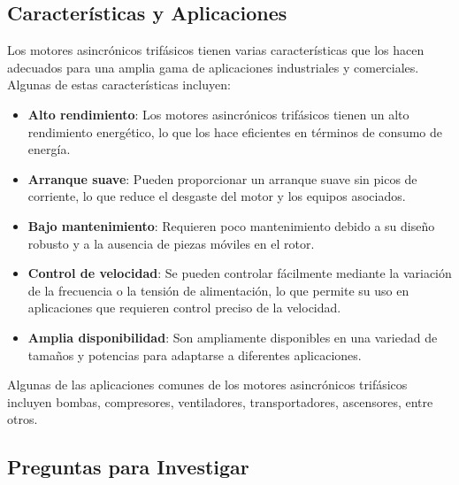 \documentclass[../main]{subfiles}
\begin{document}
\subsection*{Características y Aplicaciones}

Los motores asincrónicos trifásicos tienen varias características que los hacen adecuados para una amplia gama de aplicaciones industriales y comerciales. Algunas de estas características incluyen:

\begin{itemize}
    \item \textbf{Alto rendimiento}: Los motores asincrónicos trifásicos tienen un alto rendimiento energético, lo que los hace eficientes en términos de consumo de energía.
    \item \textbf{Arranque suave}: Pueden proporcionar un arranque suave sin picos de corriente, lo que reduce el desgaste del motor y los equipos asociados.
    \item \textbf{Bajo mantenimiento}: Requieren poco mantenimiento debido a su diseño robusto y a la ausencia de piezas móviles en el rotor.
    \item \textbf{Control de velocidad}: Se pueden controlar fácilmente mediante la variación de la frecuencia o la tensión de alimentación, lo que permite su uso en aplicaciones que requieren control preciso de la velocidad.
    \item \textbf{Amplia disponibilidad}: Son ampliamente disponibles en una variedad de tamaños y potencias para adaptarse a diferentes aplicaciones.
\end{itemize}

Algunas de las aplicaciones comunes de los motores asincrónicos trifásicos incluyen bombas, compresores, ventiladores, transportadores, ascensores, entre otros.

\subsection*{Preguntas para Investigar}
\end{document}
